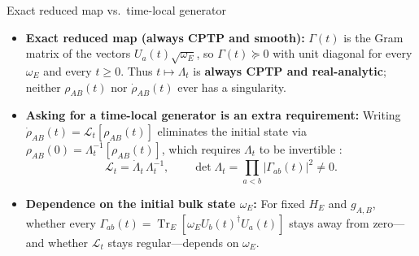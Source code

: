 \documentclass[aspectratio=169,11pt]{beamer}
\newcommand{\Tr}{\operatorname{Tr}}
\begin{document}
\begin{frame}{Exact reduced map vs.\ time-local generator}
\small
\begin{itemize}\setlength\itemsep{5pt}
\item \textbf{Exact reduced map (always CPTP and smooth):}
$\Gamma(t)$ is the Gram matrix of the vectors $U_a(t)\sqrt{\omega_E}$, so $\Gamma(t)\succeq0$ with unit diagonal for every $\omega_E$ and every $t\ge0$. Thus $t\mapsto\Lambda_t$ is \textbf{always CPTP and real-analytic}; neither $\rho_{AB}(t)$ nor $\dot\rho_{AB}(t)$ ever has a singularity.
\item \textbf{Asking for a time-local generator is an extra requirement:}
Writing $\dot\rho_{AB}(t)=\mathcal L_t[\rho_{AB}(t)]$ eliminates the initial state via $\rho_{AB}(0)=\Lambda_t^{-1}[\rho_{AB}(t)]$, which requires $\Lambda_t$ to be invertible \cite{Hall2014}:
\[
\mathcal L_t=\dot\Lambda_t\,\Lambda_t^{-1},\qquad
\det\Lambda_t=\prod_{a<b}\lvert\Gamma_{ab}(t)\rvert^2\ne0 .
\]
\item \textbf{Dependence on the initial bulk state $\omega_E$:}
For fixed $H_E$ and $g_{A,B}$, whether every $\Gamma_{ab}(t)=\Tr_E[\omega_EU_b(t)^\dagger U_a(t)]$ stays away from zero---and whether $\mathcal L_t$ stays regular---depends on $\omega_E$.
\end{itemize}
\smallskip
\begin{center}
\end{center}
\end{frame}
\end{document}
